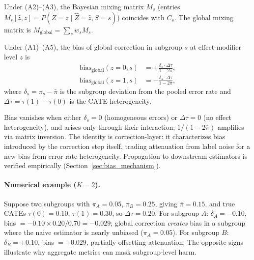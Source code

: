 Under (A2)--(A3), the Bayesian mixing matrix $M_s$ (entries $M_s[\hat{z}, z] = P(Z{=}z \mid \hat{Z}{=}\hat{z}, S{=}s)$) coincides with $C_s$.
The global mixing matrix is $M_{\text{global}} = \sum_s w_s M_s$.

\begin{theorem}
\label{thm:bias_identity}
Under \textnormal{(A1)--(A5)}, the bias of global correction in subgroup $s$ at effect-modifier level $z$ is
\begin{align}
\mathrm{bias}_{\mathrm{global}}(z{=}0, s) &= +\frac{\delta_s \cdot \Delta\tau}{1 - 2\bar{\pi}}, \label{eq:bias_z0} \\
\mathrm{bias}_{\mathrm{global}}(z{=}1, s) &= -\frac{\delta_s \cdot \Delta\tau}{1 - 2\bar{\pi}}, \label{eq:bias_z1}
\end{align}
where $\delta_s = \pi_s - \bar{\pi}$ is the subgroup deviation from the pooled error rate and $\Delta\tau = \tau(1) - \tau(0)$ is the CATE heterogeneity.
\end{theorem}

Bias vanishes when either $\delta_s = 0$ (homogeneous errors) or $\Delta\tau = 0$ (no effect heterogeneity), and arises only through their interaction; $1/(1 - 2\bar{\pi})$ amplifies via matrix inversion.
The identity is correction-layer: it characterizes bias introduced by the correction step itself, trading attenuation from label noise for a new bias from error-rate heterogeneity. Propagation to downstream estimators is verified empirically (Section~\ref{sec:bias_mechanism}).

\paragraph{Numerical example ($K{=}2$).}
Suppose two subgroups with $\pi_A = 0.05$, $\pi_B = 0.25$, giving $\bar{\pi} = 0.15$, and true CATEs $\tau(0) = 0.10$, $\tau(1) = 0.30$, so $\Delta\tau = 0.20$.
For subgroup $A$: $\delta_A = -0.10$, bias $= -0.10 \times 0.20 / 0.70 = -0.029$; global correction \emph{creates} bias in a subgroup where the naive estimator is nearly unbiased ($\pi_A = 0.05$).
For subgroup $B$: $\delta_B = +0.10$, bias $= +0.029$, partially offsetting attenuation. The opposite signs illustrate why aggregate metrics can mask subgroup-level harm.

